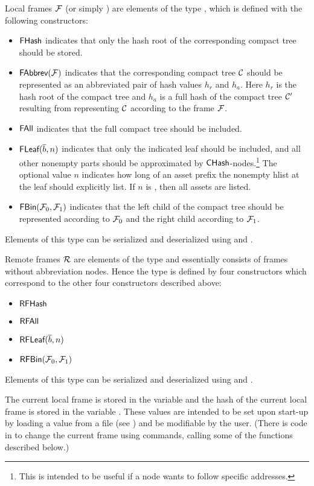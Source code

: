 Local frames $\mathcal{F}$ (or simply {}) are elements of the type {}, which is defined with the
following constructors:
\begin{itemize}
\item ${\constr{FHash}}$ indicates that only the hash root of the corresponding compact tree should be stored.
\item ${\constr{FAbbrev}}(\cF)$ indicates that the corresponding compact tree $\mathcal{C}$ should be represented
as an abbreviated pair of hash values $h_r$ and $h_a$.
Here $h_r$ is the hash root of the compact tree and $h_a$ is a full hash of the
compact tree $\mathcal{C}'$ resulting from representing $\mathcal{C}$ according to the frame $\mathcal{F}$.
\item ${\constr{FAll}}$ indicates that the full compact tree should be included.
\item ${\constr{FLeaf}}(\overline{b},n)$ indicates that only the indicated leaf should be included, and all other nonempty parts should be approximated by ${\constr{CHash}}$-nodes.\footnote{This is intended to be useful if a node wants to follow specific addresses.}
The optional value $n$ indicates how long of an asset prefix the nonempty hlist at the leaf should explicitly list. If $n$ is {}, then all assets are listed.
\item ${\constr{FBin}}(\cF_0,\cF_1)$ indicates that the left child of the compact tree should be represented according to $\mathcal{F}_0$ and the right child according to $\mathcal{F}_1$.
\end{itemize}
Elements of this type can be serialized and deserialized using
{}
and
{}.

Remote frames $\mathcal{R}$ are elements of the type {}
and essentially consists of frames without abbreviation nodes.
Hence the type is defined by four constructors which correspond to the other four
constructors described above:
\begin{itemize}
\item ${\constr{RFHash}}$
\item ${\constr{RFAll}}$
\item ${\constr{RFLeaf}}(\overline{b},n)$
\item ${\constr{RFBin}}(\cF_0,\cF_1)$
\end{itemize}
Elements of this type can be serialized and deserialized using
{}
and
{}.

The current local frame is stored in the variable
{} and the hash of the current local
frame is stored in the variable {}.
These values are intended to be set upon start-up
by loading a value from a file (see {})
and be modifiable by the user.
(There is code in {} to change the current frame
using commands,
calling some of the functions described below.)

